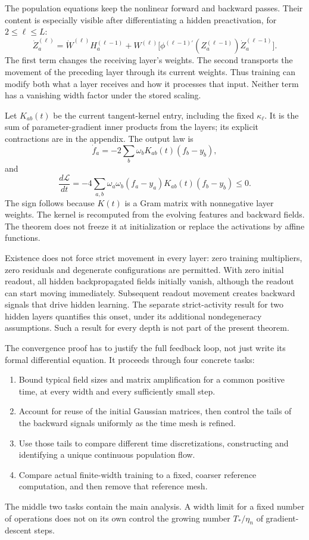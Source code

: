 The population equations keep the nonlinear forward and backward passes.
Their content is especially visible after differentiating a hidden
preactivation, for $2\le\ell\le L$:
\[
\dot Z_a^{(\ell)}
=\dot W^{(\ell)}H_a^{(\ell-1)}
 +W^{(\ell)}\bigl[
 \phi^{(\ell-1)\prime}(Z_a^{(\ell-1)})\dot Z_a^{(\ell-1)}\bigr].
\]
The first term changes the receiving layer's weights. The second transports
the movement of the preceding layer through its current weights. Thus
training can modify both what a layer receives and how it processes that
input. Neither term has a vanishing width factor under the stored scaling.

Let $K_{ab}(t)$ be the current tangent-kernel entry, including the fixed
$\kappa_\ell$. It is the sum of parameter-gradient inner products from
the layers; its explicit contractions are in the appendix. The output law is
\[
\dot f_a=-2\sum_b\omega_bK_{ab}(t)(f_b-y_b),
\]
and
\[
\frac{d\mathcal L}{dt}
=-4\sum_{a,b}\omega_a\omega_b(f_a-y_a)K_{ab}(t)(f_b-y_b)
\le0.
\]
The sign follows because $K(t)$ is a Gram matrix with nonnegative layer
weights. The kernel is recomputed from the evolving features and backward
fields. The theorem does not freeze it at initialization or replace the
activations by affine functions.

Existence does not force strict movement in every layer: zero training
multipliers, zero residuals and degenerate configurations are permitted.
With zero initial readout, all hidden backpropagated fields initially vanish,
although the readout can start moving immediately. Subsequent readout
movement creates backward signals that drive hidden learning. The separate
strict-activity result for two hidden layers quantifies this onset, under its
additional nondegeneracy assumptions. Such a result for every depth is not
part of the present theorem.

The convergence proof has to justify the full feedback loop, not just write
its formal differential equation. It proceeds through four concrete tasks:
\begin{enumerate}
\item Bound typical field sizes and matrix amplification for a common
positive time, at every width and every sufficiently small step.
\item Account for reuse of the initial Gaussian matrices, then control the
tails of the backward signals uniformly as the time mesh is refined.
\item Use those tails to compare different time discretizations, constructing
and identifying a unique continuous population flow.
\item Compare actual finite-width training to a fixed, coarser reference
computation, and then remove that reference mesh.
\end{enumerate}
The middle two tasks contain the main analysis. A width limit for a fixed
number of operations does not on its own control the growing number
$T_*/\eta_n$ of gradient-descent steps.

